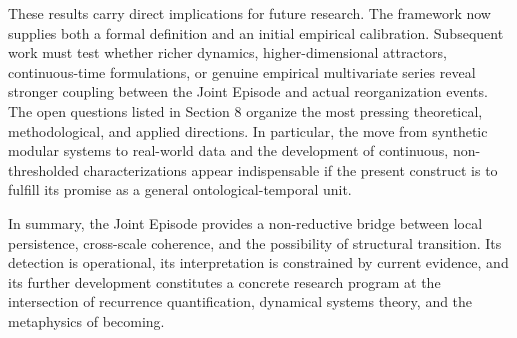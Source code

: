 These results carry direct implications for future research. The framework now supplies both a formal definition and an initial empirical calibration. Subsequent work must test whether richer dynamics, higher-dimensional attractors, continuous-time formulations, or genuine empirical multivariate series reveal stronger coupling between the Joint Episode and actual reorganization events. The open questions listed in Section 8 organize the most pressing theoretical, methodological, and applied directions. In particular, the move from synthetic modular systems to real-world data and the development of continuous, non-thresholded characterizations appear indispensable if the present construct is to fulfill its promise as a general ontological-temporal unit.

In summary, the Joint Episode provides a non-reductive bridge between local persistence, cross-scale coherence, and the possibility of structural transition. Its detection is operational, its interpretation is constrained by current evidence, and its further development constitutes a concrete research program at the intersection of recurrence quantification, dynamical systems theory, and the metaphysics of becoming.